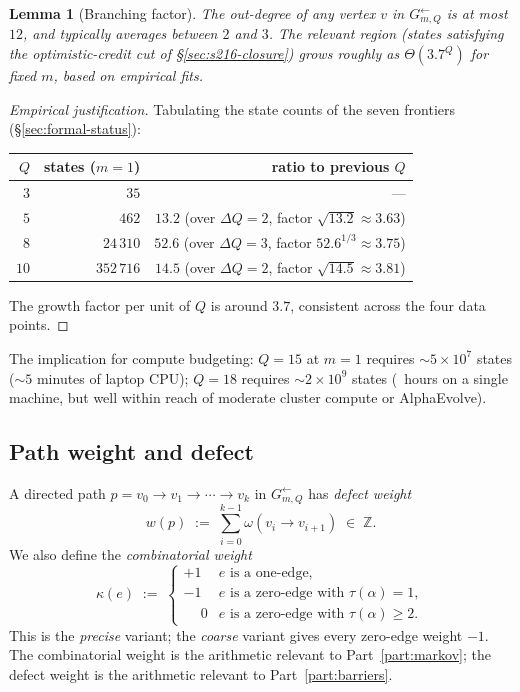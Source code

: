\documentclass[11pt,a4paper]{article}
\theoremstyle{plain}
\newtheorem{lemma}[theorem]{Lemma}
\theoremstyle{definition}
\newcommand{\ZZ}{\mathbb{Z}}
\newcommand{\InvG}{G^{\!\leftarrow}}
\begin{document}
\begin{lemma}[Branching factor]
\label{lem:branching}
The out-degree of any vertex $v$ in $\InvG_{m, Q}$ is at most $12$,
and typically averages between $2$ and $3$. The relevant region
(states satisfying the optimistic-credit cut of
\S\ref{sec:s216-closure}) grows roughly as $\Theta(3.7^{Q})$ for
fixed $m$, based on empirical fits.
\end{lemma}

\begin{proof}[Empirical justification]
Tabulating the state counts of the seven frontiers
(\S\ref{sec:formal-status}):
\begin{center}\footnotesize
\begin{tabular}{rrr}
\toprule
$Q$ & states ($m = 1$) & ratio to previous $Q$ \\
\midrule
$3$  & $35$       & ---  \\
$5$  & $462$      & $13.2$ (over $\Delta Q = 2$, factor $\sqrt{13.2} \approx 3.63$) \\
$8$  & $24\,310$  & $52.6$ (over $\Delta Q = 3$, factor $52.6^{1/3} \approx 3.75$) \\
$10$ & $352\,716$ & $14.5$ (over $\Delta Q = 2$, factor $\sqrt{14.5} \approx 3.81$) \\
\bottomrule
\end{tabular}
\end{center}
The growth factor per unit of $Q$ is around $3.7$, consistent
across the four data points.
\end{proof}

The implication for compute budgeting: $Q = 15$ at $m = 1$ requires
$\sim 5 \times 10^7$ states ($\sim 5$ minutes of laptop CPU);
$Q = 18$ requires $\sim 2 \times 10^9$ states (~hours on a single
machine, but well within reach of moderate cluster compute or
AlphaEvolve).

\subsection{Path weight and defect}

A directed path $p = v_0 \to v_1 \to \cdots \to v_k$ in
$\InvG_{m, Q}$ has \emph{defect weight}
\[
  w(p) \;:=\; \sum_{i=0}^{k-1} \omega(v_i \to v_{i+1}) \;\in\; \ZZ.
\]
We also define the \emph{combinatorial weight}
\[
  \kappa(e) \;:=\;
  \begin{cases}
    +1 & e \text{ is a one-edge}, \\
    -1 & e \text{ is a zero-edge with } \tau(\alpha) = 1, \\
    \phantom{+}0 & e \text{ is a zero-edge with } \tau(\alpha) \ge 2.
  \end{cases}
\]
This is the \emph{precise} variant; the \emph{coarse} variant gives
every zero-edge weight $-1$. The combinatorial weight is the
arithmetic relevant to Part~\ref{part:markov}; the defect weight is
the arithmetic relevant to Part~\ref{part:barriers}.
\end{document}
